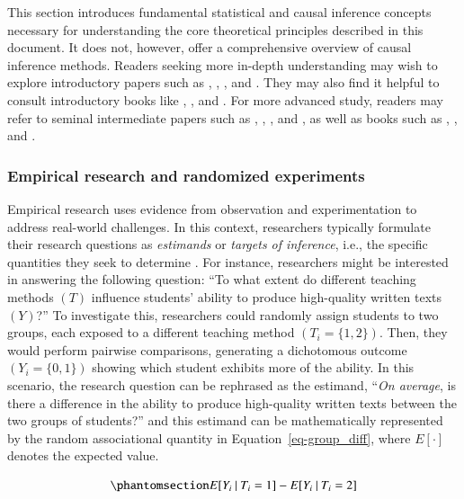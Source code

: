 \documentclass[
  authoryear,
  review,
  1p]{elsarticle}
\begin{document}
This section introduces fundamental statistical and causal inference
concepts necessary for understanding the core theoretical principles
described in this document. It does not, however, offer a comprehensive
overview of causal inference methods. Readers seeking more in-depth
understanding may wish to explore introductory papers such as
\citet{Pearl_2010}, \citet{Rohrer_2018}, \citet{Pearl_2019}, and
\citet{Cinelli_et_al_2020}. They may also find it helpful to consult
introductory books like \citet{Pearl_et_al_2018}, \citet{Neal_2020}, and
\citet{McElreath_2020}. For more advanced study, readers may refer to
seminal intermediate papers such as \citet{Neyman_et_al_1923},
\citet{Rubin_1974}, \citet{Spirtes_et_al_1991}, and \citet{Sekhon_2009},
as well as books such as \citet{Pearl_2009}, \citet{Morgan_et_al_2014},
and \citet{Hernan_et_al_2020}.

\subsubsection{Empirical research and randomized
experiments}\label{sec-appendixB1}

Empirical research uses evidence from observation and experimentation to
address real-world challenges. In this context, researchers typically
formulate their research questions as \emph{estimands} or \emph{targets
of inference}, i.e., the specific quantities they seek to determine
\citep{Everitt_et_al_2010}. For instance, researchers might be
interested in answering the following question: ``To what extent do
different teaching methods \((T)\) influence students' ability to
produce high-quality written texts \((Y)\)?'' To investigate this,
researchers could randomly assign students to two groups, each exposed
to a different teaching method \((T_{i} = \{1,2\})\). Then, they would
perform pairwise comparisons, generating a dichotomous outcome
\((Y_{i} = \{0,1\})\) showing which student exhibits more of the
ability. In this scenario, the research question can be rephrased as the
estimand, ``\emph{On average}, is there a difference in the ability to
produce high-quality written texts between the two groups of students?''
and this estimand can be mathematically represented by the random
associational quantity in Equation~\ref{eq-group_diff}, where
\(E[\cdot]\) denotes the expected value.

\begin{equation}\phantomsection\label{eq-group_diff}{
E[Y_{i} \:|\:T_{i}=1] - E[Y_{i} \:|\:T_{i}=2]
}\end{equation}
\end{document}
